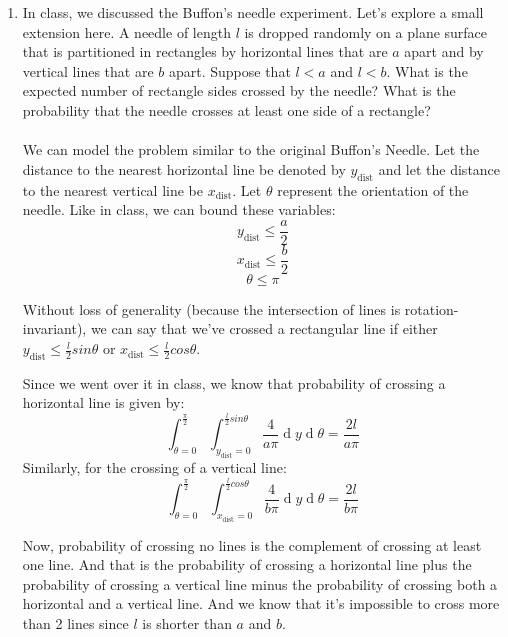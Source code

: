 
\usepackage{amsmath, dsfont}

\oddsidemargin 0in
\evensidemargin 0in
\textwidth 6.5in
\topmargin -0.5in
\textheight 9.0in
\newcommand{\norm}[1]{\left\lVert #1 \right\rVert}
\newcommand{\?}{\stackrel{?}{=}}
\newcommand\given[1][]{\:#1\vert\:}
\renewcommand{\d}[1]{\ensuremath{\operatorname{d}\!{#1}}}



\pagestyle{myheadings}

\begin{enumerate}
  \item In class, we discussed the Buffon's needle experiment. Let's explore a small extension here. A needle of length $l$ is dropped randomly on a plane surface that is partitioned in rectangles by horizontal lines that are $a$ apart and by vertical lines that are $b$ apart. Suppose that $l < a$ and $l < b$. What is the expected number of rectangle sides crossed by the needle? What is the probability that the needle crosses at least one side of a rectangle?\\\\

    We can model the problem similar to the original Buffon's Needle. Let the distance to the nearest horizontal line be denoted by $y_{\text{dist}}$ and let the distance to the nearest vertical line be $x_{\text{dist}}$. Let $\theta$ represent the orientation of the needle. Like in class, we can bound these variables:
    $$y_{\text{dist}} \leq \frac{a}{2}$$
    $$x_{\text{dist}} \leq \frac{b}{2}$$
    $$\theta \leq \pi$$

    Without loss of generality (because the intersection of lines is rotation-invariant), we can say that we've crossed a rectangular line if either $y_{\text{dist}} \leq \frac{l}{2} sin \theta$ or $x_{\text{dist}} \leq \frac{l}{2} cos \theta$. 

    Since we went over it in class, we know that probability of crossing a horizontal line is given by:
    $$\int_{\theta = 0}^{\frac{\pi}{2}} \int_{y_{\text{dist}} = 0}^{\frac{l}{2} sin \theta} \frac{4}{a\pi} \d{y} \d{\theta} = \frac{2l}{a\pi}$$
    Similarly, for the crossing of a vertical line:
    $$\int_{\theta = 0}^{\frac{\pi}{2}} \int_{x_{\text{dist}} = 0}^{\frac{l}{2} cos \theta} \frac{4}{b\pi} \d{y} \d{\theta} = \frac{2l}{b\pi}$$

    Now, probability of crossing no lines is the complement of crossing at least one line. And that is the probability of crossing a horizontal line plus the probability of crossing a vertical line minus the probability of crossing both a horizontal and a vertical line. And we know that it's impossible to cross more than 2 lines since $l$ is shorter than $a$ and $b$.\\


\end{enumerate}
